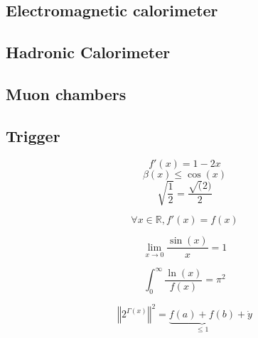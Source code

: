 \subsection{Electromagnetic calorimeter}
\label{sec:ecal}

\subsection{Hadronic Calorimeter}
\label{sec:hcal}

\subsection{Muon chambers}
\label{sec:muons}

\subsection{Trigger}
\label{sec:trigger}



\[ f'(x) = 1-2x \]
\[ \beta(x) \leq \cos(x) \]
\[ \sqrt{\frac{1}{2}}=\frac{\sqrt(2)}{2} \]

\begin{equation}
\forall x \in \mathbb{R}, f'(x)=f(x)
\end{equation}

\begin{equation}
\lim_{x\to 0}\frac{\sin(x)}{x}=1
\end{equation}

\begin{equation}
\int_{0}^{\infty}\frac{\ln(x)}{f(x)}=\pi^2
\end{equation}

\begin{equation*}
\left\Vert 2^{\Gamma(x)} \right\Vert^{2} = \underbrace{f(a)+f(b)}_{\leq 1}+\dot{y}
\end{equation*}

